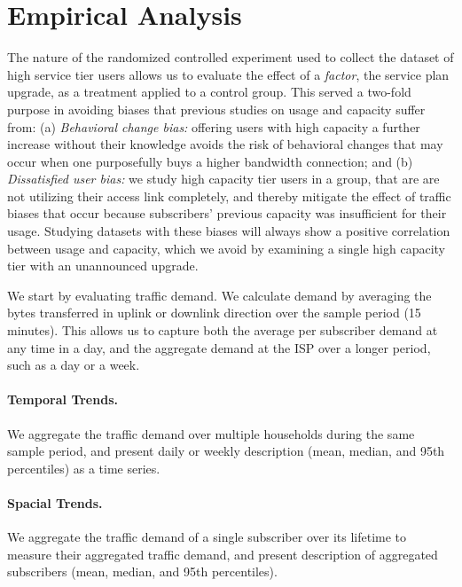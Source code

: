 \section{Empirical Analysis}\label{sec:analysis}

The nature of the randomized controlled experiment used to collect the dataset 
of high service tier users allows us to evaluate the effect of a \emph{factor}, 
the service plan upgrade, as a treatment applied to a control group. This 
served a two-fold purpose in avoiding biases that previous studies on usage and 
capacity suffer from: (a) \emph{Behavioral change 
bias:} offering users with high capacity a further increase without their 
knowledge avoids the risk of behavioral changes that may occur when one 
purposefully buys a higher bandwidth connection; and (b) \emph{Dissatisfied 
user bias:} we study high capacity tier users in a \control{} group, that are 
are not utilizing their access link completely, and thereby mitigate the effect 
of traffic biases that occur because subscribers' previous capacity was 
insufficient for their usage. Studying datasets with these biases will always 
show a positive correlation between usage and capacity, which we avoid by 
examining a single high capacity tier with an unannounced upgrade.

We start by evaluating traffic demand. We calculate demand by averaging the 
bytes transferred in uplink or downlink direction over the sample period (15 
minutes). This allows us to capture both the average per subscriber demand at 
any time in a day, and the aggregate demand at the ISP over a longer period, 
such as a day or a week.

\paragraph{Temporal Trends. } We aggregate the traffic demand over multiple 
households during the same sample period, and present daily or weekly 
description (mean, median, and 95th percentiles) as a time series.

\paragraph{Spacial Trends. } We aggregate the traffic demand of a single 
subscriber over its lifetime to measure their aggregated traffic demand, and 
present description of aggregated subscribers (mean, median, and 95th 
percentiles).


